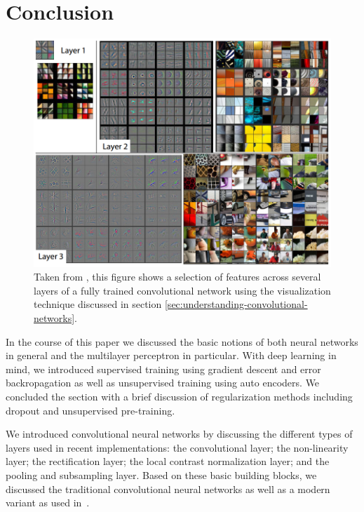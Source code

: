 \section{Conclusion}

\begin{figure}[t!]
	\centering
	\includegraphics[scale=0.625]{images/filters}
	\caption{Taken from \cite{ZeilerFergus:2013}, this figure shows a selection of features across several layers of a fully trained convolutional network using the visualization technique discussed in section \ref{sec:understanding-convolutional-networks}.}
	\label{fig:feature-activations}
\end{figure}
In the course of this paper we discussed the basic notions of both neural networks in general and the multilayer perceptron in particular. With deep learning in mind, we introduced supervised training using gradient descent and error backropagation as well as unsupervised training using auto encoders. We concluded the section with a brief discussion of regularization methods including dropout \cite{HintonSrivastavaKrizhevskySutskeverSalakhutdinov:2012} and unsupervised pre-training.

We introduced convolutional neural networks by discussing the different types of layers used in recent implementations: the convolutional layer; the non-linearity layer; the rectification layer; the local contrast normalization layer; and the pooling and subsampling layer. Based on these basic building blocks, we discussed the traditional convolutional neural networks \cite{LeCunBoserDenkerHenderson:1989} as well as a modern variant as used in~\cite{KrizhevskySutskeverHinton:2012}.

